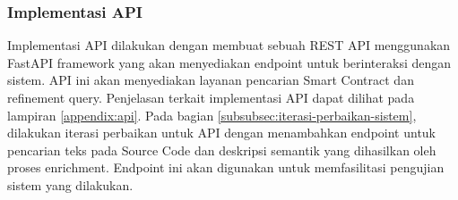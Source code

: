 \subsubsection{Implementasi API}

Implementasi API dilakukan dengan membuat sebuah REST API menggunakan FastAPI framework yang akan menyediakan endpoint untuk berinteraksi dengan sistem. API ini akan menyediakan layanan pencarian Smart Contract dan refinement query. Penjelasan terkait implementasi API dapat dilihat pada lampiran \ref{appendix:api}. Pada bagian \ref{subsubsec:iterasi-perbaikan-sistem}, dilakukan iterasi perbaikan untuk API dengan menambahkan endpoint untuk pencarian teks pada Source Code dan deskripsi semantik yang dihasilkan oleh proses enrichment. Endpoint ini akan digunakan untuk memfasilitasi pengujian sistem yang dilakukan.

